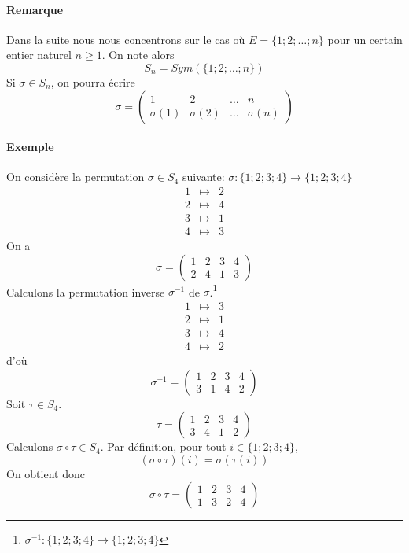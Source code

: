 \paragraph{Remarque} Dans la suite nous nous concentrons sur le cas où $E = \{1; 2; \ldots; n\}$ pour un certain entier naturel $n\geq 1$. On note alors
$$S_n = Sym(\{1; 2; \ldots; n\})$$
Si $\sigma \in S_n$, on pourra écrire
$$\sigma = \begin{pmatrix} 1 & 2 & \ldots & n \\ \sigma(1) & \sigma(2) & \ldots & \sigma(n) \end{pmatrix}$$

\paragraph{Exemple} On considère la permutation $\sigma \in S_4$ suivante: $\sigma :\{1; 2; 3; 4\} \rightarrow \{1; 2; 3; 4\}$
\begin{eqnarray*}
  1 &\mapsto& 2 \\ 2 &\mapsto& 4 \\ 3 &\mapsto& 1 \\ 4 &\mapsto& 3
\end{eqnarray*}
On a 
$$\sigma = \begin{pmatrix} 1 & 2 & 3 & 4 \\ 2 & 4  & 1 & 3 \end{pmatrix}$$
Calculons la permutation inverse $\sigma^{-1}$ de $\sigma$.\footnote{$\sigma^{-1}:\{1; 2; 3; 4\} \rightarrow \{1; 2; 3; 4\}$}
\begin{eqnarray*}
  1 &\mapsto& 3 \\ 2 &\mapsto& 1 \\ 3 &\mapsto& 4 \\ 4 &\mapsto& 2
\end{eqnarray*}
d'où 
$$\sigma^{-1} = \begin{pmatrix} 1 & 2 & 3 & 4 \\ 3 & 1 & 4 & 2 \end{pmatrix}$$
Soit $\tau \in S_4$.
$$\tau = \begin{pmatrix} 1 & 2 & 3 & 4 \\ 3 & 4 & 1 & 2 \end{pmatrix}$$
Calculons $\sigma \circ \tau \in S_4$. Par définition, pour tout $i \in \{1; 2; 3; 4\}$,
$$(\sigma \circ \tau)(i) = \sigma(\tau(i))$$
On obtient donc
$$\sigma \circ \tau =\begin{pmatrix} 1 & 2 & 3 & 4 \\ 1 & 3 & 2 & 4 \end{pmatrix}$$
